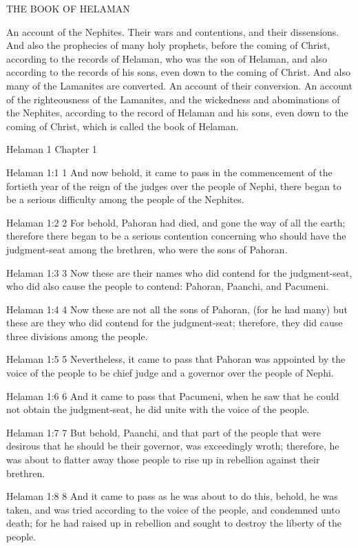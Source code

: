 THE BOOK OF HELAMAN

An account of the Nephites. Their wars and contentions, and
their dissensions. And also the prophecies of many holy
prophets, before the coming of Christ, according to the records
of Helaman, who was the son of Helaman, and also according to the
records of his sons, even down to the coming of Christ. And also
many of the Lamanites are converted. An account of their
conversion. An account of the righteousness of the Lamanites,
and the wickedness and abominations of the Nephites, according to
the record of Helaman and his sons, even down to the coming of
Christ, which is called the book of Helaman.

Helaman 1
Chapter 1

Helaman 1:1
 1 And now behold, it came to pass in the commencement of the
fortieth year of the reign of the judges over the people of
Nephi, there began to be a serious difficulty among the people of
the Nephites.

Helaman 1:2
 2 For behold, Pahoran had died, and gone the way of all the
earth; therefore there began to be a serious contention
concerning who should have the judgment-seat among the brethren,
who were the sons of Pahoran.

Helaman 1:3
 3 Now these are their names who did contend for the
judgment-seat, who did also cause the people to contend: Pahoran,
Paanchi, and Pacumeni.

Helaman 1:4
 4 Now these are not all the sons of Pahoran, (for he had many)
but these are they who did contend for the judgment-seat;
therefore, they did cause three divisions among the people.

Helaman 1:5
 5 Nevertheless, it came to pass that Pahoran was appointed by
the voice of the people to be chief judge and a governor over the
people of Nephi.

Helaman 1:6
 6 And it came to pass that Pacumeni, when he saw that he could
not obtain the judgment-seat, he did unite with the voice of the
people.

Helaman 1:7
 7 But behold, Paanchi, and that part of the people that were
desirous that he should be their governor, was exceedingly wroth;
therefore, he was about to flatter away those people to rise up
in rebellion against their brethren.

Helaman 1:8
 8 And it came to pass as he was about to do this, behold, he was
taken, and was tried according to the voice of the people, and
condemned unto death; for he had raised up in rebellion and
sought to destroy the liberty of the people.

